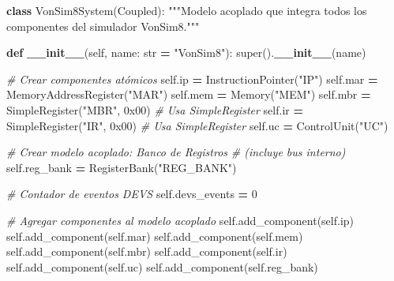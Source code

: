 \documentclass[12pt,oneside]{templates/unerthesis}
\newenvironment{Shaded}{\begin{snugshade}}{\end{snugshade}}
\newcommand{\BaseNTok}[1]{\textcolor[rgb]{0.00,0.00,0.81}{#1}}
\newcommand{\BuiltInTok}[1]{#1}
\newcommand{\CommentTok}[1]{\textcolor[rgb]{0.56,0.35,0.01}{\textit{#1}}}
\newcommand{\DecValTok}[1]{\textcolor[rgb]{0.00,0.00,0.81}{#1}}
\newcommand{\FunctionTok}[1]{\textcolor[rgb]{0.13,0.29,0.53}{\textbf{#1}}}
\newcommand{\KeywordTok}[1]{\textcolor[rgb]{0.13,0.29,0.53}{\textbf{#1}}}
\newcommand{\NormalTok}[1]{#1}
\newcommand{\OperatorTok}[1]{\textcolor[rgb]{0.81,0.36,0.00}{\textbf{#1}}}
\newcommand{\StringTok}[1]{\textcolor[rgb]{0.31,0.60,0.02}{#1}}
\newcommand{\VariableTok}[1]{\textcolor[rgb]{0.00,0.00,0.00}{#1}}
\begin{document}
\begin{Shaded}
\begin{Highlighting}[]
\KeywordTok{class}\NormalTok{ VonSim8System(Coupled):}
    \StringTok{"""Modelo acoplado que integra todos los componentes del}
\StringTok{    simulador VonSim8."""}
    
    \KeywordTok{def} \FunctionTok{\_\_init\_\_}\NormalTok{(}\VariableTok{self}\NormalTok{, name: }\BuiltInTok{str} \OperatorTok{=} \StringTok{"VonSim8"}\NormalTok{):}
        \BuiltInTok{super}\NormalTok{().}\FunctionTok{\_\_init\_\_}\NormalTok{(name)}
        
        \CommentTok{\# Crear componentes atómicos}
        \VariableTok{self}\NormalTok{.ip }\OperatorTok{=}\NormalTok{ InstructionPointer(}\StringTok{"IP"}\NormalTok{)}
        \VariableTok{self}\NormalTok{.mar }\OperatorTok{=}\NormalTok{ MemoryAddressRegister(}\StringTok{"MAR"}\NormalTok{)}
        \VariableTok{self}\NormalTok{.mem }\OperatorTok{=}\NormalTok{ Memory(}\StringTok{"MEM"}\NormalTok{)}
        \VariableTok{self}\NormalTok{.mbr }\OperatorTok{=}\NormalTok{ SimpleRegister(}\StringTok{"MBR"}\NormalTok{, }\BaseNTok{0x00}\NormalTok{)  }\CommentTok{\# Usa SimpleRegister}
        \VariableTok{self}\NormalTok{.ir }\OperatorTok{=}\NormalTok{ SimpleRegister(}\StringTok{"IR"}\NormalTok{, }\BaseNTok{0x00}\NormalTok{)    }\CommentTok{\# Usa SimpleRegister}
        \VariableTok{self}\NormalTok{.uc }\OperatorTok{=}\NormalTok{ ControlUnit(}\StringTok{"UC"}\NormalTok{)}
        
        \CommentTok{\# Crear modelo acoplado: Banco de Registros}
        \CommentTok{\# (incluye bus interno)}
        \VariableTok{self}\NormalTok{.reg\_bank }\OperatorTok{=}\NormalTok{ RegisterBank(}\StringTok{"REG\_BANK"}\NormalTok{)}
        
        \CommentTok{\# Contador de eventos DEVS}
        \VariableTok{self}\NormalTok{.devs\_events }\OperatorTok{=} \DecValTok{0}
        
        \CommentTok{\# Agregar componentes al modelo acoplado}
        \VariableTok{self}\NormalTok{.add\_component(}\VariableTok{self}\NormalTok{.ip)}
        \VariableTok{self}\NormalTok{.add\_component(}\VariableTok{self}\NormalTok{.mar)}
        \VariableTok{self}\NormalTok{.add\_component(}\VariableTok{self}\NormalTok{.mem)}
        \VariableTok{self}\NormalTok{.add\_component(}\VariableTok{self}\NormalTok{.mbr)}
        \VariableTok{self}\NormalTok{.add\_component(}\VariableTok{self}\NormalTok{.ir)}
        \VariableTok{self}\NormalTok{.add\_component(}\VariableTok{self}\NormalTok{.uc)}
        \VariableTok{self}\NormalTok{.add\_component(}\VariableTok{self}\NormalTok{.reg\_bank)}
        

\end{Highlighting}
\end{Shaded}
\end{document}
